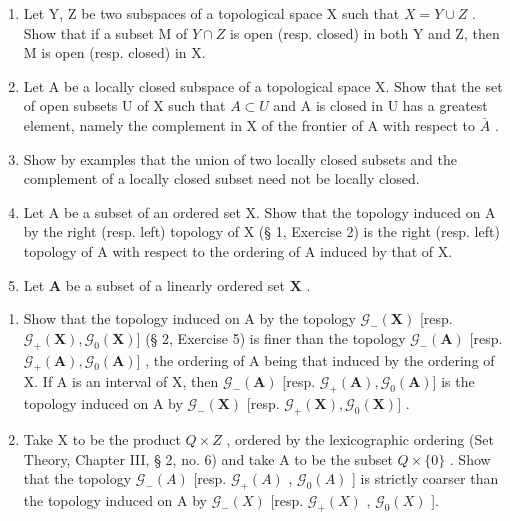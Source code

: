 \begin{enumerate}
\def\labelenumi{\arabic{enumi})}
\setcounter{enumi}{4}
\item
  Let Y, Z be two subspaces of a topological space X such that \(X = Y \cup Z\) . Show that if a subset M of \(Y \cap Z\) is open (resp. closed) in both Y and Z, then M is open (resp. closed) in X.
\item
  Let A be a locally closed subspace of a topological space X. Show that the set of open subsets U of X such that \(A \subset U\) and A is closed in U has a greatest element, namely the complement in X of the frontier of A with respect to \(\overline{A}\) .
\item
  Show by examples that the union of two locally closed subsets and the complement of a locally closed subset need not be locally closed.
\item
  Let A be a subset of an ordered set X. Show that the topology induced on A by the right (resp. left) topology of X (§ 1, Exercise 2) is the right (resp. left) topology of A with respect to the ordering of A induced by that of X.
\item
  Let \(\mathbf{A}\) be a subset of a linearly ordered set \(\mathbf{X}\) .
\end{enumerate}

\begin{enumerate}
\def\labelenumi{\alph{enumi})}
\item
  Show that the topology induced on A by the topology \(\mathcal{G}_{-}(\mathbf{X})\) {[}resp. \(\mathcal{G}_{+}(\mathbf{X}),\mathcal{G}_{0}(\mathbf{X})]\) (§ 2, Exercise 5) is finer than the topology \(\mathcal{G}_{-}(\mathbf{A})\) {[}resp. \(\mathcal{G}_{+}(\mathbf{A}),\mathcal{G}_{0}(\mathbf{A})]\) , the ordering of A being that induced by the ordering of X. If A is an interval of X, then \(\mathcal{G}_{-}(\mathbf{A})\) {[}resp. \(\mathcal{G}_{+}(\mathbf{A}),\mathcal{G}_{0}(\mathbf{A})]\) is the topology induced on A by \(\mathcal{G}_{-}(\mathbf{X})\) {[}resp. \(\mathcal{G}_{+}(\mathbf{X}),\mathcal{G}_{0}(\mathbf{X})]\) .
\item
  Take X to be the product \(Q \times Z\) , ordered by the lexicographic ordering (Set Theory, Chapter III, § 2, no. 6) and take A to be the subset \(Q \times \{0\}\) . Show that the topology \(\mathcal{G}_{-}(A)\) {[}resp. \(\mathcal{G}_{+}(A)\) , \(\mathcal{G}_{0}(A)\) {]} is strictly coarser than the topology induced on A by \(\mathcal{G}_{-}(X)\) {[}resp. \(\mathcal{G}_{+}(X)\) , \(\mathcal{G}_{0}(X)\) {]}.
\end{enumerate}

